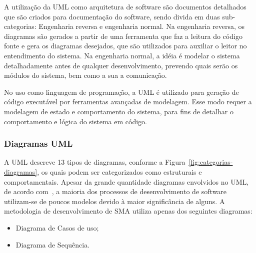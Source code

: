 A utilização da UML como arquitetura de software são documentos detalhados que são criados para documentação do software, sendo divida em duas sub-categorias: Engenharia reversa e engenharia normal. Na engenharia reversa, os diagramas são gerados a partir de uma ferramenta que faz a leitura do código fonte e gera os diagramas desejados, que são utilizados para auxiliar o leitor no entendimento do sistema. Na engenharia normal, a idéia é modelar o sistema detalhadamente antes de qualquer desenvolvimento, prevendo quais serão os módulos do sistema, bem como a sua a comunicação.

No uso como linguagem de programação, a UML é utilizado para geração de código executável por ferramentas avançadas de modelagem. Esse modo requer a modelagem de estado e comportamento do sistema, para fins de detalhar o comportamento e lógica do sistema em código.

\subsubsection{Diagramas UML}

A UML descreve 13 tipos de diagramas, conforme a Figura~\ref{fig:categorias-diagramas}, os quais podem ser categorizados como estruturais e comportamentais. Apesar da grande quantidade diagramas envolvidos no UML, de acordo com~\cite{larman08}, a maioria dos processos de desenvolvimento de software utilizam-se de poucos modelos devido à maior significância de alguns. A metodologia de desenvolvimento de SMA utiliza apenas dos seguintes diagramas:

\begin{itemize}
	\item Diagrama de Casos de uso;
	\item Diagrama de Sequência.
\end{itemize}

